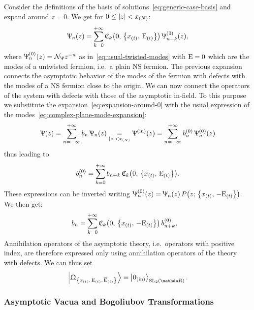 Consider the definitions of the basis of solutions~\eqref{eq:generic-case-basis} and expand around $z = 0$.\footnotemark{}
We get for $0 \le \abs{z} < x_{(N)}$:
\begin{equation}
  \Psi_n( z )
  =
  \zeroinfsum{k}
  \cmode{k}{0}{\rE_{(t)}}{x_{(t)}}\,
  \Psi^{( 0 )}_{n-k}( z ),
  \label{eq:expansion-around-0}
\end{equation}
where $\Uppsi^{( 0 )}_n( z ) = \mathcal{N}_{\Uppsi} z^{-n}$ as in~\eqref{eq:usual-twisted-modes} with $\mathrm{E} = 0$ which are the modes of a untwisted fermion, i.e.\ a plain NS fermion.
The previous expansion connects the asymptotic behavior of the modes of the fermion with defects with the modes of a NS fermion close to the origin.
We can now connect the operators of the system with defects with those of the asymptotic in-field.
To this purpose we substitute the expansion~\eqref{eq:expansion-around-0} with the usual expression of the modes~\eqref{eq:complex-plane-mode-expansion}:
\begin{equation}
  \Uppsi( z )
  =
  \sum\limits_{n = -\infty}^{+\infty}
  b_n\, \Uppsi_n( z )
  \underset{\abs{z} < x_{(N)}}{=}
  \Uppsi^{(\text{in})}( z )
  =
  \sum\limits_{n = -\infty}^{+\infty}
  b_n^{( 0 )}\, \Uppsi_n^{( 0 )}( z )
\end{equation}
thus leading to
\begin{equation}
    b_n^{( 0 )}
    =
    \zeroinfsum{k}
    b_{n + k}\, \cmode{k}{0}{\rE_{(t)}}{x_{(t)}}.
\end{equation}
These expressions can be inverted writing $\Psi^{( 0 )}_{n}( z ) = \Psi_{n}( z )\, P\qty(z;\, \qty{x_{(t)},\, -\rE_{(t)}} )$.
We then get:
\begin{equation}
  \begin{split}
    b_n
    & =
    \zeroinfsum{k}
    \cmode{k}{0}{-\rE_{(t)}}{x_{(t)}}\, b^{(0)}_{n + k},
  \end{split}
\end{equation}
Annihilation operators of the asymptotic theory, i.e.\ operators with positive index, are therefore expressed only using annihilation operators of the theory with defects.
We can thus set
\begin{equation}
  \Gexcvacket = \regvacuumin.
\end{equation}

  
\subsubsection{Asymptotic Vacua and Bogoliubov Transformations}

